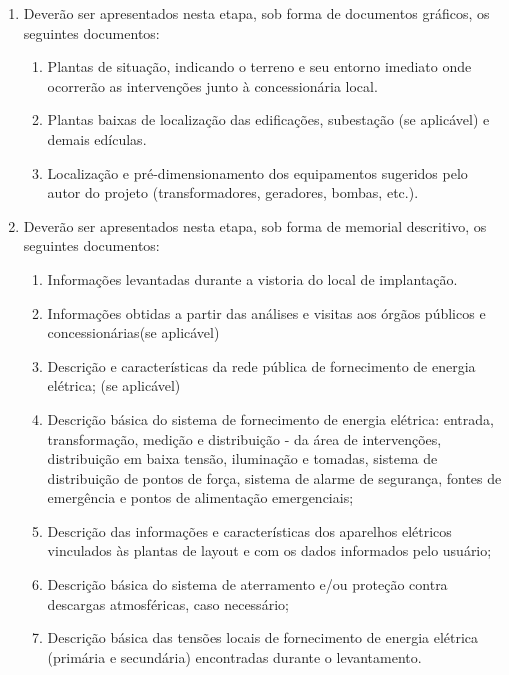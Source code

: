 \begin{enumerate}
	
	\item Deverão ser apresentados nesta etapa, sob forma de documentos gráficos, os seguintes documentos:
		\begin{enumerate}
			\item Plantas de situação, indicando o terreno e seu entorno imediato onde ocorrerão as intervenções junto à concessionária local.
		
			\item Plantas baixas de localização das edificações, subestação (se aplicável) e demais edículas.
		
			\item Localização e pré-dimensionamento dos equipamentos sugeridos pelo autor do projeto (transformadores, geradores, bombas, etc.).
		\end{enumerate}

	\item Deverão ser apresentados nesta etapa, sob forma de memorial descritivo, os seguintes documentos:
		\begin{enumerate}
			\item Informações levantadas durante a vistoria do local de implantação.
			
			\item Informações obtidas a partir das análises e visitas aos órgãos públicos e concessionárias(se aplicável)
			
			\item Descrição e características da rede pública de fornecimento de energia elétrica; (se aplicável)

			\item Descrição básica do sistema de fornecimento de energia elétrica: entrada, transformação, medição e distribuição - da área de intervenções, distribuição em baixa tensão, iluminação e tomadas, sistema de distribuição de pontos de força, sistema de alarme de segurança, fontes de emergência e pontos de alimentação emergenciais; 

			\item Descrição das informações e características dos aparelhos elétricos vinculados às plantas de layout e com os dados informados pelo usuário; 			

			\item Descrição básica do sistema de aterramento e/ou proteção contra descargas atmosféricas, caso necessário;

			\item Descrição básica das tensões locais de fornecimento de energia elétrica (primária e secundária) encontradas durante o levantamento.
			

\end{enumerate}
\end{enumerate}
